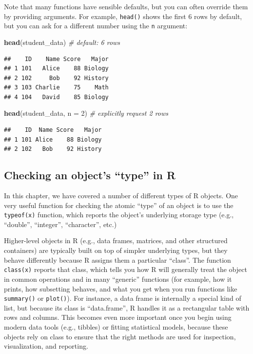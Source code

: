 \documentclass[
  11pt,
]{article}
\newenvironment{Shaded}{\begin{snugshade}}{\end{snugshade}}
\newcommand{\AttributeTok}[1]{\textcolor[rgb]{0.13,0.29,0.53}{#1}}
\newcommand{\CommentTok}[1]{\textcolor[rgb]{0.56,0.35,0.01}{\textit{#1}}}
\newcommand{\DecValTok}[1]{\textcolor[rgb]{0.00,0.00,0.81}{#1}}
\newcommand{\FunctionTok}[1]{\textcolor[rgb]{0.13,0.29,0.53}{\textbf{#1}}}
\newcommand{\NormalTok}[1]{#1}
\begin{document}
Note that many functions have sensible defaults, but you can often
override them by providing arguments. For example, \texttt{head()} shows
the first 6 rows by default, but you can ask for a different number
using the \texttt{n} argument:

\begin{Shaded}
\begin{Highlighting}[]
\FunctionTok{head}\NormalTok{(student\_data) }\CommentTok{\# default: 6 rows}
\end{Highlighting}
\end{Shaded}

\begin{verbatim}
##    ID    Name Score   Major
## 1 101   Alice    88 Biology
## 2 102     Bob    92 History
## 3 103 Charlie    75    Math
## 4 104   David    85 Biology
\end{verbatim}

\begin{Shaded}
\begin{Highlighting}[]
\FunctionTok{head}\NormalTok{(student\_data, }\AttributeTok{n =} \DecValTok{2}\NormalTok{) }\CommentTok{\# explicitly request 2 rows}
\end{Highlighting}
\end{Shaded}

\begin{verbatim}
##    ID  Name Score   Major
## 1 101 Alice    88 Biology
## 2 102   Bob    92 History
\end{verbatim}

\subsection{Checking an object's ``type'' in
R}\label{checking-an-objects-type-in-r}

In this chapter, we have covered a number of different types of R
objects. One very useful function for checking the atomic ``type'' of an
object is to use the \texttt{typeof(x)} function, which reports the
object's underlying storage type (e.g., ``double'', ``integer'',
``character'', etc.)

Higher-level objects in R (e.g., data frames, matrices, and other
structured containers) are typically built on top of simpler underlying
types, but they behave differently because R assigns them a particular
``class''. The function \texttt{class(x)} reports that class, which
tells you how R will generally treat the object in common operations and
in many ``generic'' functions (for example, how it prints, how
subsetting behaves, and what you get when you run functions like
\texttt{summary()} or \texttt{plot()}). For instance, a data frame is
internally a special kind of list, but because its class is
``data.frame'', R handles it as a rectangular table with rows and
columns. This becomes even more important once you begin using modern
data tools (e.g., tibbles) or fitting statistical models, because these
objects rely on class to ensure that the right methods are used for
inspection, visualization, and reporting.
\end{document}
